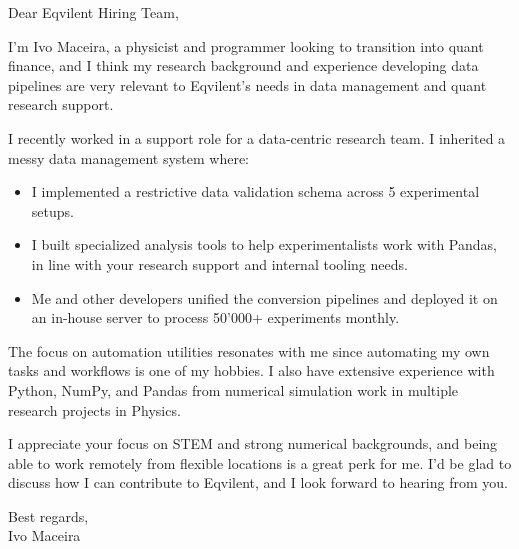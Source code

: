 \documentclass[a4paper,11pt]{letter}
\begin{document}
Dear Eqvilent Hiring Team,

I'm Ivo Maceira, a physicist and programmer looking to transition into quant finance, and I think my research background and experience developing data pipelines are very relevant to Eqvilent's needs in data management and quant research support.

I recently worked in a support role for a data-centric research team. I inherited a messy data management system where:

\begin{itemize}
	\item I implemented a restrictive data validation schema across 5 experimental setups.
	\item I built specialized analysis tools to help experimentalists work with Pandas, in line with your research support and internal tooling needs.
	\item Me and other developers unified the conversion pipelines and deployed it on an in-house server to process 50'000+ experiments monthly.
\end{itemize}

The focus on automation utilities resonates with me since automating my own tasks and workflows is one of my hobbies. I also have extensive experience with Python, NumPy, and Pandas from numerical simulation work in multiple research projects in Physics.

I appreciate your focus on STEM and strong numerical backgrounds, and being able to work remotely from flexible locations is a great perk for me. I'd be glad to discuss how I can contribute to Eqvilent, and I look forward to hearing from you.

Best regards, \\
Ivo Maceira
\end{document}
